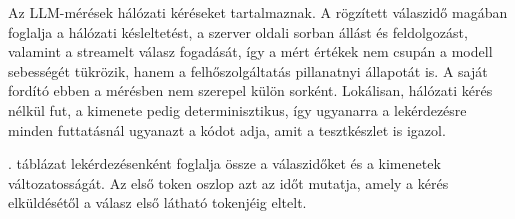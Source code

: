 Az LLM-mérések hálózati kéréseket tartalmaznak. A rögzített válaszidő magában foglalja a hálózati késleltetést, a szerver oldali sorban állást és feldolgozást, valamint a streamelt válasz fogadását, így a mért értékek nem csupán a modell sebességét tükrözik, hanem a felhőszolgáltatás pillanatnyi állapotát is. A saját fordító ebben a mérésben nem szerepel külön sorként. Lokálisan, hálózati kérés nélkül fut, a kimenete pedig determinisztikus, így ugyanarra a lekérdezésre minden futtatásnál ugyanazt a kódot adja, amit a tesztkészlet is igazol.


. táblázat lekérdezésenként foglalja össze a válaszidőket és a kimenetek változatosságát. Az első token oszlop azt az időt mutatja, amely a kérés elküldésétől a válasz első látható tokenjéig eltelt.


